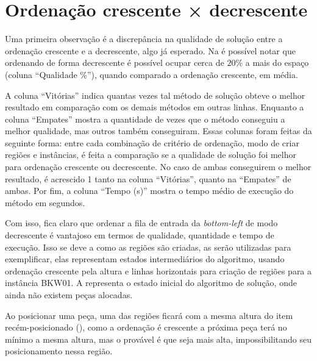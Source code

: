\section{Ordenação crescente × decrescente}\label{sec:ordenacao-crescente-decrescente}

Uma primeira observação é a discrepância na qualidade de solução entre a ordenação crescente
e a decrescente, algo já esperado.
Na  é possível notar que ordenando de forma decrescente é possível ocupar
cerca de $20\%$ a mais do espaço (coluna “Qualidade \%”), quando comparado a ordenação crescente,
em média.



A coluna “Vitórias” indica quantas vezes tal método de solução obteve o melhor resultado em
comparação com os demais métodos em outras linhas.
Enquanto a coluna “Empates” mostra a quantidade de vezes que o método conseguiu a melhor qualidade,
mas outros também conseguiram.
Essas colunas foram feitas da seguinte forma: entre cada combinação de critério de ordenação,
modo de criar regiões e instâncias, é feita a comparação se a qualidade de solução foi melhor
para ordenação crescente ou decrescente.
No caso de ambas conseguirem o melhor resultado, é acrescido 1 tanto na coluna “Vitórias”, quanto
na “Empates” de ambas.
Por fim, a coluna “Tempo (s)” mostra o tempo médio de execução do método em segundos.

Com isso, fica claro que ordenar a fila de entrada da \textit{bottom-left} de modo decrescente é
vantajoso em termos de qualidade, quantidade e tempo de execução.
Isso se deve a como as regiões são criadas,
as  serão utilizadas para exemplificar,
elas representam estados intermediários do algoritmo, usando ordenação crescente pela altura
e linhas horizontais para criação de regiões para a instância BKW01.
A  representa o estado inicial do algoritmo de solução, onde ainda
não existem peças alocadas.



Ao posicionar uma peça, uma das regiões ficará com a mesma altura do item recém-posicionado
(), como a ordenação é crescente a próxima peça terá no mínimo a mesma altura,
mas o provável é que seja mais alta, impossibilitando seu posicionamento nessa região.

